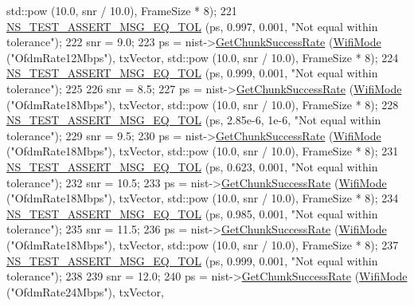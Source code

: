 \begin{DoxyCode}
      std::pow (10.0, snr / 10.0), FrameSize * 8);
221   \hyperlink{group__testing_ga9e7861b56b4e70db3b56044cb7a28e41}{NS\_TEST\_ASSERT\_MSG\_EQ\_TOL} (ps, 0.997, 0.001, \textcolor{stringliteral}{"Not equal within tolerance"});
222   snr = 9.0;
223   ps = nist->\hyperlink{classns3_1_1NistErrorRateModel_a2316a2c287485d7cc81198c90b246bc0}{GetChunkSuccessRate} (\hyperlink{classns3_1_1WifiMode}{WifiMode} (\textcolor{stringliteral}{"OfdmRate12Mbps"}), txVector, 
      std::pow (10.0, snr / 10.0), FrameSize * 8);
224   \hyperlink{group__testing_ga9e7861b56b4e70db3b56044cb7a28e41}{NS\_TEST\_ASSERT\_MSG\_EQ\_TOL} (ps, 0.999, 0.001, \textcolor{stringliteral}{"Not equal within tolerance"});
225 
226   snr = 8.5;
227   ps = nist->\hyperlink{classns3_1_1NistErrorRateModel_a2316a2c287485d7cc81198c90b246bc0}{GetChunkSuccessRate} (\hyperlink{classns3_1_1WifiMode}{WifiMode} (\textcolor{stringliteral}{"OfdmRate18Mbps"}), txVector, 
      std::pow (10.0, snr / 10.0), FrameSize * 8);
228   \hyperlink{group__testing_ga9e7861b56b4e70db3b56044cb7a28e41}{NS\_TEST\_ASSERT\_MSG\_EQ\_TOL} (ps, 2.85e-6, 1e-6, \textcolor{stringliteral}{"Not equal within tolerance"});
229   snr = 9.5;
230   ps = nist->\hyperlink{classns3_1_1NistErrorRateModel_a2316a2c287485d7cc81198c90b246bc0}{GetChunkSuccessRate} (\hyperlink{classns3_1_1WifiMode}{WifiMode} (\textcolor{stringliteral}{"OfdmRate18Mbps"}), txVector, 
      std::pow (10.0, snr / 10.0), FrameSize * 8);
231   \hyperlink{group__testing_ga9e7861b56b4e70db3b56044cb7a28e41}{NS\_TEST\_ASSERT\_MSG\_EQ\_TOL} (ps, 0.623, 0.001, \textcolor{stringliteral}{"Not equal within tolerance"});
232   snr = 10.5;
233   ps = nist->\hyperlink{classns3_1_1NistErrorRateModel_a2316a2c287485d7cc81198c90b246bc0}{GetChunkSuccessRate} (\hyperlink{classns3_1_1WifiMode}{WifiMode} (\textcolor{stringliteral}{"OfdmRate18Mbps"}), txVector, 
      std::pow (10.0, snr / 10.0), FrameSize * 8);
234   \hyperlink{group__testing_ga9e7861b56b4e70db3b56044cb7a28e41}{NS\_TEST\_ASSERT\_MSG\_EQ\_TOL} (ps, 0.985, 0.001, \textcolor{stringliteral}{"Not equal within tolerance"});
235   snr = 11.5;
236   ps = nist->\hyperlink{classns3_1_1NistErrorRateModel_a2316a2c287485d7cc81198c90b246bc0}{GetChunkSuccessRate} (\hyperlink{classns3_1_1WifiMode}{WifiMode} (\textcolor{stringliteral}{"OfdmRate18Mbps"}), txVector, 
      std::pow (10.0, snr / 10.0), FrameSize * 8);
237   \hyperlink{group__testing_ga9e7861b56b4e70db3b56044cb7a28e41}{NS\_TEST\_ASSERT\_MSG\_EQ\_TOL} (ps, 0.999, 0.001, \textcolor{stringliteral}{"Not equal within tolerance"});
238 
239   snr = 12.0;
240   ps = nist->\hyperlink{classns3_1_1NistErrorRateModel_a2316a2c287485d7cc81198c90b246bc0}{GetChunkSuccessRate} (\hyperlink{classns3_1_1WifiMode}{WifiMode} (\textcolor{stringliteral}{"OfdmRate24Mbps"}), txVector, 

\end{DoxyCode}
